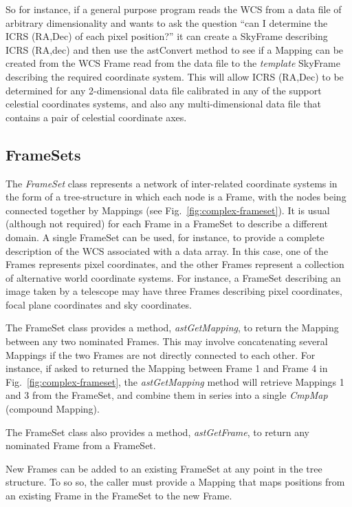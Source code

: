 \documentclass[final,authoryear,5p,times,twocolumn]{elsarticle}
\begin{document}
So for instance, if a general purpose program reads the WCS from a data
file of arbitrary dimensionality and wants to ask the question ``can I
determine the ICRS (RA,Dec) of each pixel position?'' it can create a
SkyFrame describing ICRS (RA,dec) and then use the astConvert method to see
if a Mapping can be created from the WCS Frame read from the data file to
the \emph{template} SkyFrame describing the required coordinate system.
This will allow ICRS (RA,Dec) to be determined for any 2-dimensional data
file calibrated in any of the support celestial coordinates systems, and
also any multi-dimensional data file that contains a pair of celestial
coordinate axes.

\subsection{FrameSets}

The \emph{FrameSet} class represents a network of inter-related
coordinate systems in the form of a tree-structure in which each node
is a Frame, with the nodes being connected together by Mappings (see
Fig.~\ref{fig:complex-frameset}). It is
usual (although not required) for each Frame in a FrameSet to describe a
different domain. A single FrameSet can be used, for instance, to provide
a complete description of the WCS associated with a data array. In this
case, one of the Frames represents pixel coordinates, and the other
Frames represent a collection of alternative world coordinate systems.
For instance, a FrameSet describing an image taken by a telescope may
have three Frames describing pixel coordinates, focal plane coordinates
and sky coordinates.

The FrameSet class provides a method, \emph{astGetMapping}, to return the
Mapping between any two nominated Frames. This may involve concatenating
several Mappings if the two Frames are not directly connected to each
other. For instance, if asked to returned the Mapping between Frame 1 and
Frame 4 in Fig.~\ref{fig:complex-frameset}, the \emph{astGetMapping} method
will retrieve Mappings 1 and 3 from the FrameSet, and combine them in
series into a single \emph{CmpMap} (compound Mapping).

The FrameSet class also provides a method, \emph{astGetFrame}, to
return any nominated Frame from a FrameSet.

New Frames can be added to an existing FrameSet at any point in the tree
structure. To so so, the caller must provide a Mapping that maps positions
from an existing Frame in the FrameSet to the new Frame.
\end{document}
